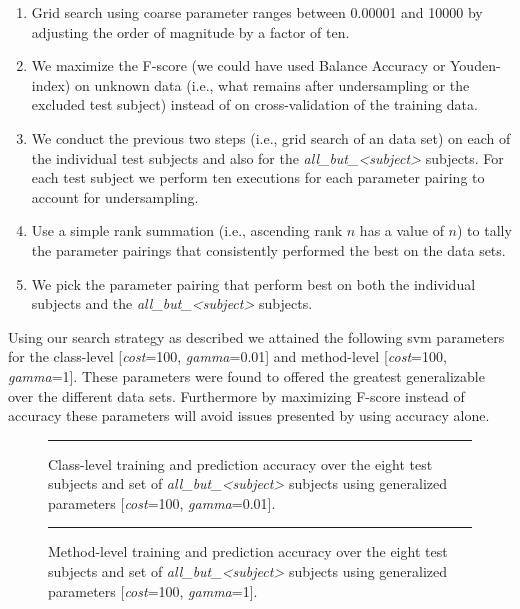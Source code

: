 \begin{enumerate}
  \item Grid search using coarse parameter ranges between 0.00001 and 10000 by adjusting the order of magnitude by a factor of ten.
  \item We maximize the F-score (we could have used Balance Accuracy or Youden-index) on unknown data (i.e., what remains after undersampling or the excluded test subject) instead of on cross-validation of the training data.
  \item We conduct the previous two steps (i.e., grid search of an data set) on each of the individual test subjects and also for the \emph{all\_but\_<subject>} subjects. For each test subject we perform ten executions for each parameter pairing to account for  undersampling.
  \item Use a simple rank summation (i.e., ascending rank $n$ has a value of $n$) to tally the parameter pairings that consistently performed the best on the data sets.
  \item We pick the parameter pairing that perform best on both the individual subjects and the \emph{all\_but\_<subject>} subjects.
\end{enumerate}

Using our search strategy as described we attained the following \gls{svm} parameters for the class-level [\emph{cost}=100, \emph{gamma}=0.01] and method-level [\emph{cost}=100, \emph{gamma}=1]. These parameters were found to offered the greatest generalizable over the different data sets. Furthermore by maximizing F-score instead of accuracy these parameters will avoid issues presented by using accuracy alone.

\begin{figure}[!tb]
  \centering
  \begin{adjustbox}{max size={.95\textwidth}{.95\textheight}}
    
  \end{adjustbox}
  \caption{Class-level training and prediction accuracy over the eight test subjects and set of \emph{all\_but\_<subject>} subjects using generalized parameters [\emph{cost}=100, \emph{gamma}=0.01].}
  \vspace{2mm}
  \hrule
  \label{fig:prediction_with_parameters_class_graph}
\end{figure}

\begin{figure}[!tb]
  \centering
  \begin{adjustbox}{max size={.95\textwidth}{.95\textheight}}
    
  \end{adjustbox}
  \caption{Method-level training and prediction accuracy over the eight test subjects and set of \emph{all\_but\_<subject>} subjects using generalized parameters [\emph{cost}=100, \emph{gamma}=1].}
  \vspace{2mm}
  \hrule
  \label{fig:prediction_with_parameters_method_graph}
\end{figure}

